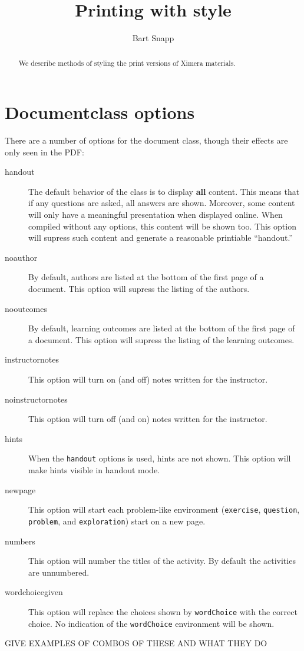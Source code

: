 \documentclass{ximera}
\title{Printing with style}
\author{Bart Snapp}
\begin{document}
\begin{abstract}
We describe methods of styling the print versions of Ximera materials.
\end{abstract}
\maketitle
 


\section{Documentclass options}

There are a number of options for the document class, though their
effects are only seen in the PDF:
 
\begin{description}
\item[handout] The default behavior of the class is to display \textbf{all} content. This means that if any questions are asked, all answers are shown. Moreover, some content will only have a meaningful presentation when displayed online. When compiled without any options, this content will be shown too. This option will supress such content and generate a reasonable printiable ``handout.''
\item[noauthor] By default, authors are listed at the bottom of the first page of a document. This option will supress the listing of the authors.
\item[nooutcomes] By default, learning outcomes are listed at the bottom of the first page of a document. This option will supress the listing of the learning outcomes.
\item[instructornotes] This option will turn on (and off) notes written for the instructor.
\item[noinstructornotes] This option will turn off (and on) notes written for the instructor.
\item[hints] When the \texttt{handout} options is used, hints are not shown. This option will make hints visible in handout mode.
\item[newpage] This option will start each problem-like environment (\texttt{exercise}, \texttt{question}, \texttt{problem}, and \texttt{exploration}) start on a new page.
\item[numbers] This option will number the titles of the activity. By default the activities are unnumbered.
\item[wordchoicegiven] This option will replace the choices shown by \texttt{wordChoice} with the correct choice. No indication of the \texttt{wordChoice} environment will be shown.
\end{description}


GIVE EXAMPLES OF COMBOS OF THESE AND WHAT THEY DO
\end{document}
